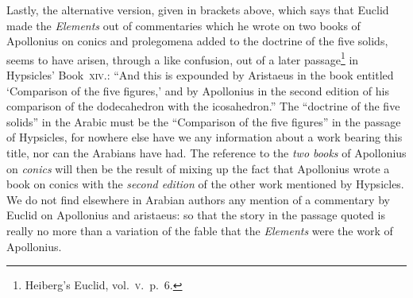 Lastly, the alternative version, given in brackets above, which says that Euclid made the \emph{Elements} out of commentaries which he wrote on two books of Apollonius on conics and prolegomena added to the doctrine of the five solids, seems to have arisen, through a like confusion, out of a later passage\footnote{Heiberg's Euclid, vol.~\textsc{v}.~p.~6.} in Hypsicles' Book~\textsc{xiv.}: ``And this is expounded by Aristaeus in the book entitled `Comparison of the five figures,' and by Apollonius in the second edition of his comparison of the dodecahedron with the icosahedron.'' The ``doctrine of the five solids'' in the Arabic must be the ``Comparison of the five figures'' in the passage of Hypsicles, for nowhere else have we any information about a work bearing this title, nor can the Arabians have had. The reference to the \emph{two books} of Apollonius on \emph{conics} will then be the result of mixing up the fact that Apollonius wrote a book on conics with the \emph{second edition} of the other work mentioned by Hypsicles. We do not find elsewhere in Arabian authors any mention of a commentary by Euclid on Apollonius and aristaeus: so that the story in the passage quoted is really no more than a variation of the fable that the \emph{Elements} were the work of Apollonius.